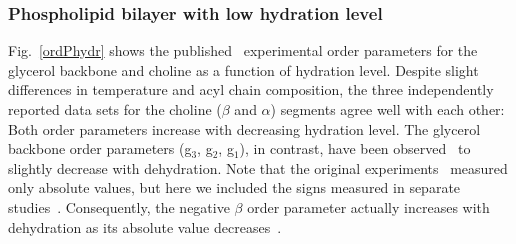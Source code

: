 \documentclass[journal=jacsat,manuscript=article]{achemso}
\begin{document}
\subsubsection{Phospholipid bilayer with low hydration level}
Fig.~\ref{ordPhydr} shows the published~\cite{dvinskikh05b,ulrich94,bechinger91} experimental order parameters
for the glycerol backbone and choline as a function of hydration level.
Despite slight differences in temperature and acyl chain composition,
the three independently reported data sets for the choline ($\beta$ and $\alpha$) segments agree well with each other:
Both order parameters increase with decreasing hydration level.
The glycerol backbone order parameters (g$_{3}$, g$_{2}$, g$_{1}$), in contrast,
have been observed~\cite{dvinskikh05b} to slightly decrease with dehydration.
Note that the original experiments~\cite{dvinskikh05b,ulrich94,bechinger91} measured only 
absolute values, but here
we included the signs measured in separate studies~\cite{hong95a,hong95b,gross97}. 
Consequently, the negative $\beta$ order parameter actually increases with dehydration 
as its absolute value decreases~\cite{dvinskikh05b,ulrich94,bechinger91}.
\end{document}
